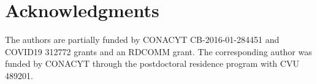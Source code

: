 \documentclass [10pt] {article}
\begin{document}
\section{Acknowledgments}

The authors are partially funded by CONACYT CB-2016-01-284451 and COVID19 312772 grants and an RDCOMM grant.
The corresponding author was funded by CONACYT through the postdoctoral residence program with CVU  489201.




\newpage







\end{document}
